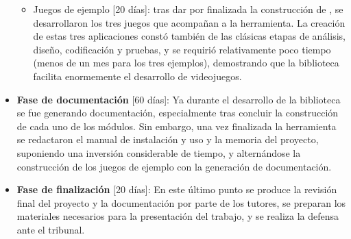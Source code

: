 \begin{itemize}
\begin{itemize}
\begin{enumerate}
		\end{enumerate}
	\item Juegos de ejemplo [20 días]: tras dar por finalizada la construcción de , se desarrollaron los tres juegos que acompañan a la herramienta. La creación de estas tres aplicaciones constó también de las clásicas etapas de análisis, diseño, codificación y pruebas, y se requirió relativamente poco tiempo (menos de un mes para los tres ejemplos), demostrando que la biblioteca facilita enormemente el desarrollo de videojuegos.
	\end{itemize}

\item \textbf{Fase de documentación} [60 días]: Ya durante el desarrollo de la biblioteca se fue generando documentación, especialmente tras concluir la construcción de cada uno de los módulos. Sin embargo, una vez finalizada la herramienta se redactaron el manual de instalación y uso y la memoria del proyecto, suponiendo una inversión considerable de tiempo, y alternándose la construcción de los juegos de ejemplo con la generación de documentación.

\item \textbf{Fase de finalización} [20 días]: En este último punto se produce la revisión final del proyecto y la documentación por parte de los tutores, se preparan los materiales necesarios para la presentación del trabajo, y se realiza la defensa ante el tribunal.

\end{itemize}


